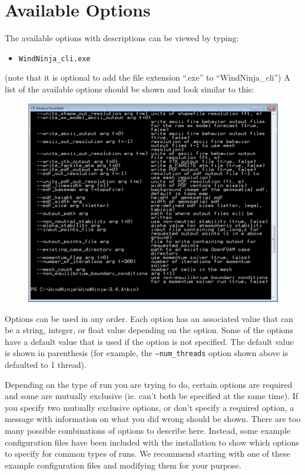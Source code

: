 \documentclass[12pt]{article}
\begin{document}
\section*{Available Options}
The available options with descriptions can be viewed by typing:
\begin{itemize}
\item[]\texttt{WindNinja\_cli.exe}
\end{itemize}
(note that it is optional to add the file extension “.exe” to “WindNinja\_cli”)
A list of the available options should be shown and look similar to this:
\begin{figure}[H]
	\centering
	\label{}
	\includegraphics[scale=0.6]{cli-1}
\end{figure}

Options can be used in any order.  Each option has an associated value that can be a string, integer, or float value depending on the option.  Some of the options have a default value that is used if the option is not specified.  The default value is shown in parenthesis (for example,  the \texttt{--num\_threads} option shown above is defaulted to 1 thread).

Depending on the type of run you are trying to do, certain options are required and some are mutually exclusive (ie. can't both be specified at the same time).  If you specify two mutually exclusive options, or don't specify a required option, a message with information on what you did wrong should be shown.  There are too many possible combinations of options to describe here.  Instead, some example configuration files have been included with the installation to show which options to specify for common types of runs.  We recommend starting with one of these example configuration files and modifying them for your purpose.
\newpage
\end{document}
